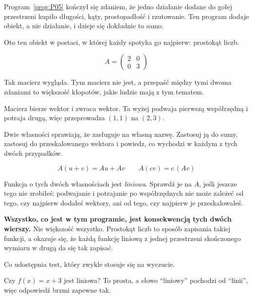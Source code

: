 \begin{fr}
Program~\ref{prog:P05} kończył się zdaniem, że jedno działanie dodane do gołej
przestrzeni kupiło długości, kąty, prostopadłość i rzutowanie. Ten program
dodaje obiekt, a nie działanie, i dzieje się dokładnie to samo.

Oto ten obiekt w postaci, w której każdy spotyka go najpierw: prostokąt liczb.

\[ A = \begin{pmatrix} 2 & 0 \\ 0 & 3 \end{pmatrix} \]

Tak macierz wygląda. Tym macierz nie jest, a przepaść między tymi dwoma
zdaniami to większość kłopotów, jakie ludzie mają z tym tematem.
\end{fr}

\begin{fr}
Macierz bierze wektor i zwraca wektor. Ta wyżej podwaja pierwszą współrzędną i
potraja drugą, więc przeprowadza $(1, 1)$ na $(2, 3)$.

Dwie własności sprawiają, że zasługuje na własną nazwę. Zastosuj ją do sumy,
zastosuj do przeskalowanego wektora i powiedz, co wychodzi w każdym z tych
dwóch przypadków.
\dotline
\nextframe
\end{fr}

\begin{fr}
\begin{ansblock}
\[ A(u + v) = Au + Av \qquad A(cv) = c\,(Av) \]
\end{ansblock}

Funkcja o tych dwóch własnościach jest \emph{liniowa}. Sprawdź je na $A$, jeśli
jeszcze tego nie zrobiłeś: podwajanie i potrajanie po współrzędnych nie może
zależeć od tego, czy najpierw dodałeś wektory, ani od tego, czy najpierw je
przeskalowałeś.

\textbf{Wszystko, co jest w tym programie, jest konsekwencją tych dwóch
wierszy.} Nie większość \dash{} wszystko. Prostokąt liczb to sposób zapisania
takiej funkcji, a okazuje się, że każdą funkcję liniową z jednej przestrzeni
skończonego wymiaru w drugą da się tak zapisać.
\end{fr}


\begin{fr}
Co udostępnia test, który zwykle stosuje się na wyczucie.

Czy $f(x) = x + 3$ jest liniowa? To prosta, a słowo \enquote{liniowy} pochodzi
od \enquote{linii}, więc odpowiedź brzmi zapewne tak.
\nextframe
\end{fr}

